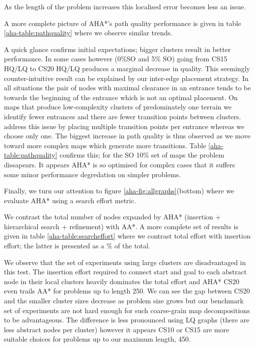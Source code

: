 As the length of the problem increases this localised error becomes less an issue.
\par \indent
A more complete picture of AHA*'s path quality performance is given in table \ref{aha-table:pathquality} where we observe similar trends. 

A quick glance confirms initial expectations; bigger clusters result in better performance. 
In some cases however (0\%SO and 5\% SO) going from CS15 HQ/LQ to CS20 HQ/LQ produces a marginal decrease in quality. 
This seemingly counter-intuitive result can be explained by our inter-edge placement strategy. 
In all situations the pair of nodes with maximal clearance in an entrance tends to be towards the beginning of the entrance which is not an optimal placement. 
On maps that produce low-complexity clusters of predominately one terrain we identify fewer entrances and there are fewer transition points between clusters. 
\cite{botea04} address this issue by placing multiple transition points per entrance whereas we choose only one. 
The biggest increase in path quality is thus observed as we move toward more complex maps which generate more transitions. 
Table \ref{aha-table:pathquality} confirms this; for the SO 10\% set of maps the problem dissapears. 
It appears AHA* is so optimised for complex cases that it suffers some minor performance degredation on simpler problems. 
\par \indent
Finally, we turn our attention to figure \ref{aha-fig:allgraphs}(bottom) where we evaluate AHA* using a search effort metric. 

We contrast the total number of nodes expanded by AHA* (insertion + hierarchical search + refinement) with AA*.
A more complete set of results is given in table \ref{aha-table:searcheffort} where we contrast total effort with insertion effort; the latter is presented as a \% of the total.
\par \indent
We observe that the set of experiments using large clusters are disadvantaged in this test. 
The insertion effort required to connect start and goal to each abstract node in their local clusters heavily dominates the total effort and AHA* CS20 even trails AA* for problems up to length 250. 
We can see the gap between CS20 and the smaller cluster sizes decrease as problem size grows but our benchmark set of experiments are not hard enough for such coarse-grain map decompositions to be advantageous. 
The difference is less pronounced using LQ graphs (there are less abstract nodes per cluster) however it appears CS10 or CS15 are more suitable choices for problems up to our maximum length, 450.
